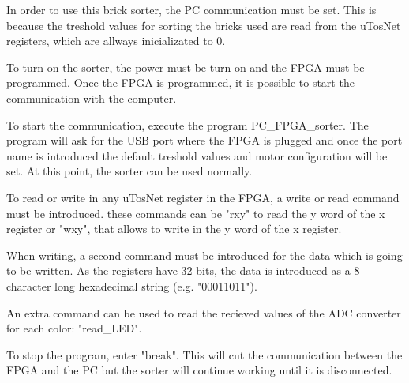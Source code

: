\label{app:usageguide}


In order to use this brick sorter, the PC communication must be set. This is because the treshold values for sorting the bricks used are read from the uTosNet registers, which are allways inicializated to 0.

To turn on the sorter, the power must be turn on and the FPGA must be programmed.
Once the FPGA is programmed, it is possible to start the communication with the computer.

To start the communication, execute the program PC\_FPGA\_sorter. The program will ask for the USB port where the FPGA is plugged and once the port name is introduced the default treshold values and motor configuration will be set. At this point, the sorter can be used normally.

To read or write in any uTosNet register in the FPGA, a write or read command must be introduced. these commands can be "rxy" to read the y word of the x register or "wxy", that allows to write in the y word of the x register.

When writing, a second command must be introduced for the data which is going to be written. As the registers have 32 bits, the data is introduced as a 8 character long hexadecimal string (e.g. "00011011").

An extra command can be used to read the recieved values of the ADC converter for each color: "read\_LED".

To stop the program, enter "break". This will cut the communication between the FPGA and the PC but the sorter will continue working until it is disconnected.



